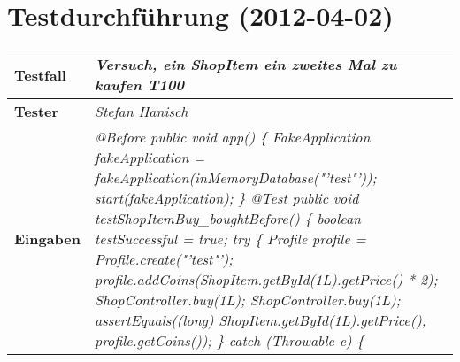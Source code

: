 
\chapter{Testdurchführung (2012-04-02)}



\begin{longtable}{|p{4cm}|p{11cm}|}
\hline
\textbf{Testfall} & \textit{Versuch, ein ShopItem ein zweites Mal zu kaufen \textbf{T100}} \\
\hline
\textbf{Tester} & \textit{Stefan Hanisch} \\
\hline
\textbf{Eingaben} & \textit{@Before \newline
public void app() \{ \newline
\hspace*{1mm}FakeApplication fakeApplication \newline
\hspace*{4mm}= fakeApplication(inMemoryDatabase("'test"'));\newline
\hspace*{1mm}start(fakeApplication); \newline
\} \newline
\newline
@Test \newline
public void testShopItemBuy\_boughtBefore() \{\newline
\hspace*{1mm}boolean testSuccessful = true; \newline
\hspace*{1mm}try \{\newline
\hspace*{3mm}Profile profile = Profile.create("'test"');\newline
\hspace*{3mm}profile.addCoins(ShopItem.getById(1L).getPrice() * 2);\newline
\hspace*{3mm}ShopController.buy(1L);\newline
\hspace*{3mm}ShopController.buy(1L);\newline
\hspace*{3mm}assertEquals((long) ShopItem.getById(1L).getPrice(), \newline
\hspace*{6mm}profile.getCoins());\newline
\hspace*{1mm}\} catch (Throwable e) \{ \newline
}
\end{longtable}
